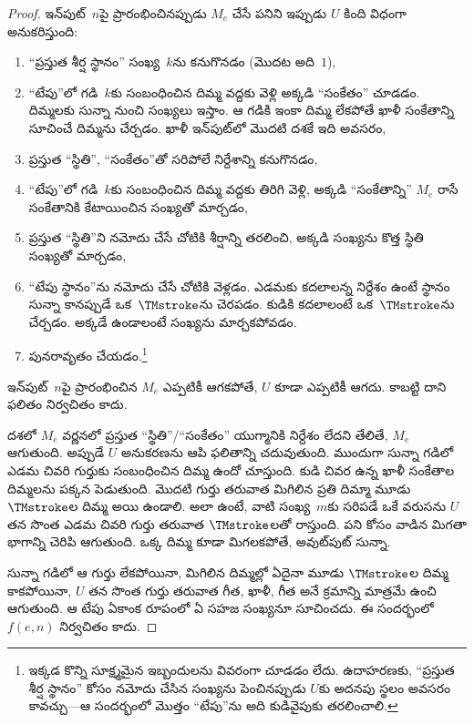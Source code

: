 \documentclass[../../../include/open-logic-section]{subfiles}
\begin{document}
\begin{proof}
  ఇన్‌పుట్~$n$పై ప్రారంభించినప్పుడు $M_e$ చేసే పనిని ఇప్పుడు $U$ కింది
  విధంగా అనుకరిస్తుంది:
  \begin{enumerate}
    \item ``ప్రస్తుత శీర్ష స్థానం'' సంఖ్య~$k$ను కనుగొనడం (మొదట అది~$1$),
    \item ``టేపు''లో గడి~$k$కు సంబంధించిన దిమ్మ వద్దకు వెళ్లి అక్కడి ``సంకేతం''
    చూడడం. దిమ్మలకు సున్నా నుంచి సంఖ్యలు ఇస్తాం. ఆ గడికి ఇంకా దిమ్మ లేకపోతే
    ఖాళీ సంకేతాన్ని సూచించే దిమ్మను చేర్చడం. ఖాళీ ఇన్‌పుట్‌లో మొదటి దశకే
    ఇది అవసరం,
    \item{}%
    ప్రస్తుత ``స్థితి'', ``సంకేతం''తో సరిపోలే నిర్దేశాన్ని కనుగొనడం,
    \item ``టేపు''లో గడి~$k$కు సంబంధించిన దిమ్మ వద్దకు తిరిగి వెళ్లి, అక్కడి ``సంకేతాన్ని''
    $M_e$ రాసే సంకేతానికి కేటాయించిన సంఖ్యతో మార్చడం,
    \item ప్రస్తుత ``స్థితి''ని నమోదు చేసే చోటికి శీర్షాన్ని తరలించి, అక్కడి
    సంఖ్యను కొత్త స్థితి సంఖ్యతో మార్చడం,
    \item ``టేపు స్థానం''ను నమోదు చేసే చోటికి వెళ్లడం. ఎడమకు కదలాలన్న
    నిర్దేశం ఉంటే స్థానం సున్నా కానప్పుడే ఒక~$\TMstroke$ను చెరపడం.
    కుడికి కదలాలంటే ఒక~$\TMstroke$ను చేర్చడం. అక్కడే ఉండాలంటే సంఖ్యను మార్చకపోవడం.
    \item పునరావృతం చేయడం.\footnote{ఇక్కడ కొన్ని సూక్ష్మమైన ఇబ్బందులను
    వివరంగా చూడడం లేదు. ఉదాహరణకు, ``ప్రస్తుత శీర్ష స్థానం'' కోసం నమోదు చేసిన
    సంఖ్యను పెంచినప్పుడు $U$కు అదనపు స్థలం అవసరం కావచ్చు---ఆ సందర్భంలో
    మొత్తం ``టేపు''ను అది కుడివైపుకు తరలించాలి.}
  \end{enumerate}
  ఇన్‌పుట్~$n$పై ప్రారంభించిన $M_e$ ఎప్పటికీ ఆగకపోతే, $U$ కూడా ఎప్పటికీ
  ఆగదు. కాబట్టి దాని ఫలితం నిర్వచితం కాదు.

   దశలో $M_e$ వర్ణనలో ప్రస్తుత ``స్థితి''/``సంకేతం''
  యుగ్మానికి నిర్దేశం లేదని తేలితే, $M_e$ ఆగుతుంది. అప్పుడే $U$ అనుకరణను
  ఆపి ఫలితాన్ని చదువుతుంది. ముందుగా సున్నా గడిలో ఎడమ చివరి గుర్తుకు
  సంబంధించిన దిమ్మ ఉందో చూస్తుంది. కుడి చివర ఉన్న ఖాళీ సంకేతాల దిమ్మలను
  పక్కన పెడుతుంది. మొదటి గుర్తు తరువాత మిగిలిన ప్రతి దిమ్మా మూడు~$\TMstroke$ల
  దిమ్మ అయి ఉండాలి. అలా ఉంటే, వాటి సంఖ్య~$m$కు సరిపడే ఒకే వరుసను $U$
  తన సొంత ఎడమ చివరి గుర్తు తరువాత $\TMstroke$లతో రాస్తుంది. పని కోసం
  వాడిన మిగతా భాగాన్ని చెరిపి ఆగుతుంది. ఒక్క దిమ్మ కూడా మిగలకపోతే,
  అవుట్‌పుట్ సున్నా.

  సున్నా గడిలో ఆ గుర్తు లేకపోయినా, మిగిలిన దిమ్మల్లో ఏదైనా మూడు
  $\TMstroke$ల దిమ్మ కాకపోయినా, $U$ తన సొంత గుర్తు తరువాత గీత, ఖాళీ,
  గీత అనే క్రమాన్ని మాత్రమే ఉంచి ఆగుతుంది. ఆ టేపు ఏకాంక రూపంలో ఏ సహజ
  సంఖ్యనూ సూచించదు. ఈ సందర్భంలో $f(e,n)$ నిర్వచితం కాదు.
\end{proof}
\end{document}
